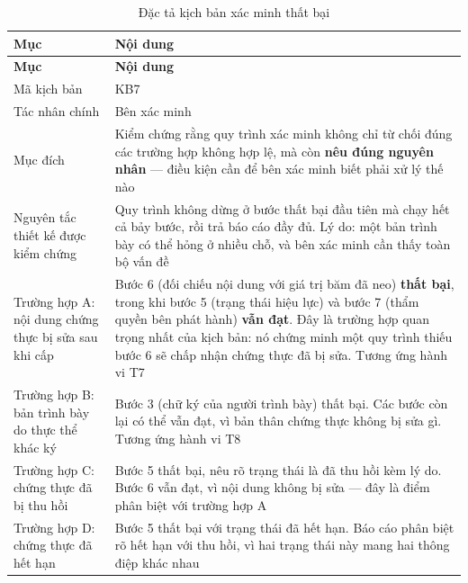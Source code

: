 \begin{longtable}{|p{3.4cm}|p{10.3cm}|}
\caption{Đặc tả kịch bản xác minh thất bại}
\label{tab:verification-failure-scenario} \\

\hline
\textbf{Mục} & \textbf{Nội dung} \\
\hline
\endfirsthead

\hline
\textbf{Mục} & \textbf{Nội dung} \\
\hline
\endhead

\hline
\endfoot

\hline
\endlastfoot

Mã kịch bản & KB7 \\
\hline

Tác nhân chính & Bên xác minh \\
\hline

Mục đích &
Kiểm chứng rằng quy trình xác minh không chỉ từ chối đúng các trường hợp không hợp lệ, mà còn \textbf{nêu đúng nguyên nhân} --- điều kiện cần để bên xác minh biết phải xử lý thế nào \\
\hline

Nguyên tắc thiết kế được kiểm chứng &
Quy trình không dừng ở bước thất bại đầu tiên mà chạy hết cả bảy bước, rồi trả báo cáo đầy đủ. Lý do: một bản trình bày có thể hỏng ở nhiều chỗ, và bên xác minh cần thấy toàn bộ vấn đề \\
\hline

Trường hợp A: nội dung chứng thực bị sửa sau khi cấp &
Bước 6 (đối chiếu nội dung với giá trị băm đã neo) \textbf{thất bại}, trong khi bước 5 (trạng thái hiệu lực) và bước 7 (thẩm quyền bên phát hành) \textbf{vẫn đạt}. Đây là trường hợp quan trọng nhất của kịch bản: nó chứng minh một quy trình thiếu bước 6 sẽ chấp nhận chứng thực đã bị sửa. Tương ứng hành vi T7 \\
\hline

Trường hợp B: bản trình bày do thực thể khác ký &
Bước 3 (chữ ký của người trình bày) thất bại. Các bước còn lại có thể vẫn đạt, vì bản thân chứng thực không bị sửa gì. Tương ứng hành vi T8 \\
\hline

Trường hợp C: chứng thực đã bị thu hồi &
Bước 5 thất bại, nêu rõ trạng thái là đã thu hồi kèm lý do. Bước 6 vẫn đạt, vì nội dung không bị sửa --- đây là điểm phân biệt với trường hợp A \\
\hline

Trường hợp D: chứng thực đã hết hạn &
Bước 5 thất bại với trạng thái đã hết hạn. Báo cáo phân biệt rõ hết hạn với thu hồi, vì hai trạng thái này mang hai thông điệp khác nhau \\
\hline


\end{longtable}
